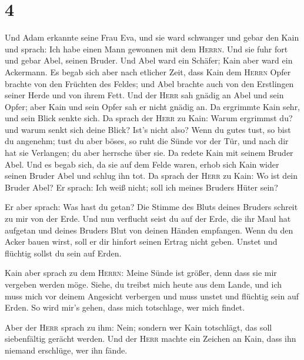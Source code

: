 \hypertarget{section-3}{%
\section{4}\label{section-3}}

 Und Adam erkannte seine Frau Eva, und sie ward schwanger
und gebar den Kain und sprach: Ich habe einen Mann gewonnen mit dem
\textsc{Herrn}.  Und sie fuhr fort und gebar Abel, seinen
Bruder. Und Abel ward ein Schäfer; Kain aber ward ein Ackermann.
 Es begab sich aber nach etlicher Zeit, dass Kain dem
\textsc{Herrn} Opfer brachte von den Früchten des Feldes; 
und Abel brachte auch von den Erstlingen seiner Herde und von ihrem
Fett. Und der \textsc{Herr} sah gnädig an Abel und sein Opfer;
 aber Kain und sein Opfer sah er nicht gnädig an. Da
ergrimmte Kain sehr, und sein Blick senkte sich.  Da
sprach der \textsc{Herr} zu Kain: Warum ergrimmst du? und warum senkt
sich deine Blick?  Ist's nicht also? Wenn du gutes tust,
so bist du angenehm; tust du aber böses, so ruht die Sünde vor der Tür,
und nach dir hat sie Verlangen; du aber herrsche über sie.
 Da redete Kain mit seinem Bruder Abel. Und es begab sich,
da sie auf dem Felde waren, erhob sich Kain wider seinen Bruder Abel und
schlug ihn tot.  Da sprach der \textsc{Herr} zu Kain: Wo
ist dein Bruder Abel? Er sprach: Ich weiß nicht; soll ich meines Bruders
Hüter sein?

 Er aber sprach: Was hast du getan? Die Stimme des Bluts
deines Bruders schreit zu mir von der Erde.  Und nun
verflucht seist du auf der Erde, die ihr Maul hat aufgetan und deines
Bruders Blut von deinen Händen empfangen.  Wenn du den
Acker bauen wirst, soll er dir hinfort seinen Ertrag nicht geben. Unstet
und flüchtig sollst du sein auf Erden.

 Kain aber sprach zu dem \textsc{Herrn}: Meine Sünde ist
größer, denn dass sie mir vergeben werden möge.  Siehe,
du treibst mich heute aus dem Lande, und ich muss mich vor deinem
Angesicht verbergen und muss unstet und flüchtig sein auf Erden. So wird
mir's gehen, dass mich totschlage, wer mich findet.

 Aber der \textsc{Herr} sprach zu ihm: Nein; sondern wer
Kain totschlägt, das soll siebenfältig gerächt werden. Und der
\textsc{Herr} machte ein Zeichen an Kain, dass ihn niemand erschlüge,
wer ihn fände.

